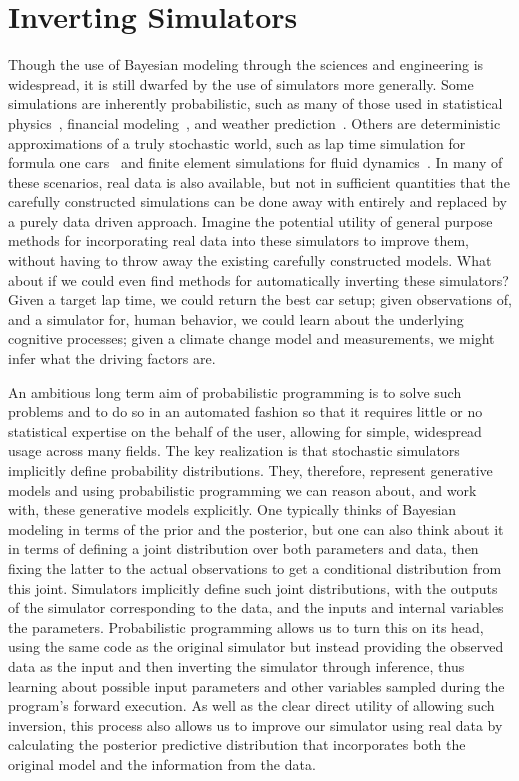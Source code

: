 
\section{Inverting Simulators}
\label{sec:probprog:inv}

Though the use of Bayesian modeling through the sciences and engineering is widespread,
it is still dwarfed by the use of simulators more generally.  Some simulations are inherently
probabilistic, such as many of those used in statistical physics~\citep{landau2014guide},
 financial modeling~\citep{jackel2002monte}, and weather prediction~\citep{evensen1994sequential}.  
 Others are deterministic approximations
of a truly stochastic world, such as lap time simulation for formula one cars~\citep{perantoni2014optimal}
and finite element simulations for fluid dynamics~\citep{versteeg2007introduction}.
In many of these scenarios, real data is also available, but not in sufficient quantities that the carefully
constructed simulations can be done away with entirely and replaced by a purely data driven
approach.  
Imagine the potential utility of general purpose methods for incorporating real data
into these simulators to improve them, without having to throw away the existing carefully constructed models.  
What about if we could even find methods for automatically
inverting these simulators?  Given a target lap time, we could return the best car setup; given observations
of, and a simulator for, human behavior, we could learn about the underlying cognitive processes; given
a climate change model and measurements, we might infer what the driving factors are.  

An ambitious long
term aim of probabilistic programming is to solve such problems and to do so in an automated fashion
so that it requires little or no statistical expertise on the behalf of the user, allowing for simple, widespread usage
across many fields.  The key realization is that stochastic simulators implicitly define probability distributions.
They, therefore, represent generative models and using probabilistic programming we can reason about, and
work with, these generative models explicitly.  One typically thinks of Bayesian modeling in terms of the
prior and the posterior, but one can also think about it in terms of defining a joint distribution over
both parameters and data, then fixing the latter to the actual observations to get a conditional distribution from
this joint.  Simulators implicitly define such joint distributions, with the outputs of the simulator corresponding
to the data, and the inputs and internal variables the parameters.  Probabilistic programming allows us to turn this on its head,
using the same code as the original simulator but instead providing the observed data as the input and
then inverting the simulator through inference, thus learning about possible input parameters and other 
variables sampled during the program's forward execution.  
As well as the clear direct utility of allowing such inversion, this process also allows us to improve
our simulator using real data by calculating the posterior predictive distribution that incorporates both
the original model and the information from the data.

